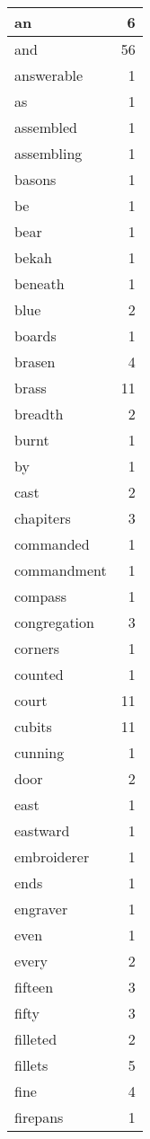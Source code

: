 \begin{center}
\begin{longtable}{l|r}
an & 6 \\ \hline
and & 56 \\ \hline
answerable & 1 \\ \hline
as & 1 \\ \hline
assembled & 1 \\ \hline
assembling & 1 \\ \hline
basons & 1 \\ \hline
be & 1 \\ \hline
bear & 1 \\ \hline
bekah & 1 \\ \hline
beneath & 1 \\ \hline
blue & 2 \\ \hline
boards & 1 \\ \hline
brasen & 4 \\ \hline
brass & 11 \\ \hline
breadth & 2 \\ \hline
burnt & 1 \\ \hline
by & 1 \\ \hline
cast & 2 \\ \hline
chapiters & 3 \\ \hline
commanded & 1 \\ \hline
commandment & 1 \\ \hline
compass & 1 \\ \hline
congregation & 3 \\ \hline
corners & 1 \\ \hline
counted & 1 \\ \hline
court & 11 \\ \hline
cubits & 11 \\ \hline
cunning & 1 \\ \hline
door & 2 \\ \hline
east & 1 \\ \hline
eastward & 1 \\ \hline
embroiderer & 1 \\ \hline
ends & 1 \\ \hline
engraver & 1 \\ \hline
even & 1 \\ \hline
every & 2 \\ \hline
fifteen & 3 \\ \hline
fifty & 3 \\ \hline
filleted & 2 \\ \hline
fillets & 5 \\ \hline
fine & 4 \\ \hline
firepans & 1 \\ \hline

\end{longtable}
\end{center}
